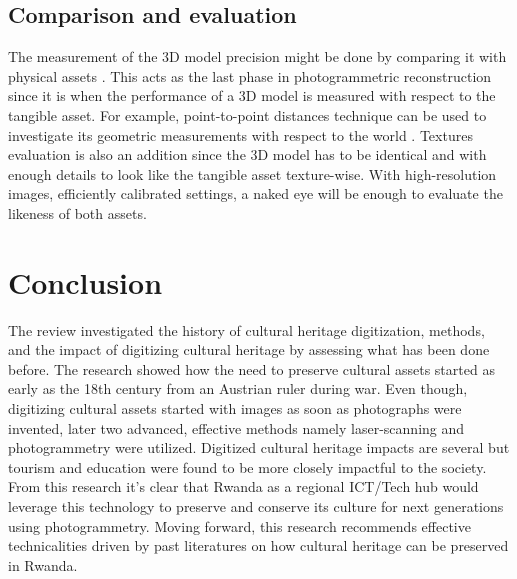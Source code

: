 \documentclass[conference]{IEEEtran}
\begin{document}
\subsection{Comparison and evaluation}
The measurement of the 3D model precision might be done by comparing it with physical assets \cite{An2022}. This acts as the last phase in photogrammetric reconstruction since it is when the performance of a 3D model is measured with respect to the tangible asset. For example, point-to-point distances technique can be used to investigate its geometric measurements with respect to the world \cite{article}. Textures evaluation is also an addition since the 3D model has to be identical and with enough details to look like the tangible asset texture-wise. With high-resolution images, efficiently calibrated settings, a naked eye will be enough to evaluate the likeness of both assets.

\section{\textbf{Conclusion}}
The review investigated the history of cultural heritage digitization, methods, and the impact of digitizing cultural heritage by assessing what has been done before.
The research showed how the need to preserve cultural assets started as early as the 18th century from an Austrian ruler during war. Even though, digitizing cultural assets started with images as soon as photographs were invented, later two
advanced, effective methods namely laser-scanning and photogrammetry were utilized. Digitized cultural heritage impacts are several but tourism and education were found to be more closely impactful to the society. From this research it's clear
that Rwanda as a regional ICT/Tech hub \cite{rwtechub} would leverage this technology to preserve and conserve its culture for next generations using photogrammetry. Moving forward, this research recommends effective technicalities driven by past literatures on how
cultural heritage can be preserved in Rwanda.


\printbibliography
\end{document}
